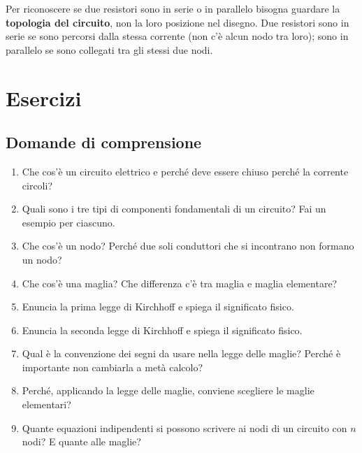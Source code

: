 \begin{attenzione}
Per riconoscere se due resistori sono in serie o in parallelo bisogna guardare la \textbf{topologia del circuito}, non la loro posizione nel disegno. Due resistori sono in serie se sono percorsi dalla stessa corrente (non c'è alcun nodo tra loro); sono in parallelo se sono collegati tra gli stessi due nodi.
\end{attenzione}


























\section{Esercizi}

\subsection{Domande di comprensione}

\begin{enumerate}[leftmargin=1cm]
  \item Che cos'è un circuito elettrico e perché deve essere chiuso perché la corrente circoli?
  \item Quali sono i tre tipi di componenti fondamentali di un circuito? Fai un esempio per ciascuno.
  \item Che cos'è un nodo? Perché due soli conduttori che si incontrano non formano un nodo?
  \item Che cos'è una maglia? Che differenza c'è tra maglia e maglia elementare?
  \item Enuncia la prima legge di Kirchhoff e spiega il significato fisico.
  \item Enuncia la seconda legge di Kirchhoff e spiega il significato fisico.
  \item Qual è la convenzione dei segni da usare nella legge delle maglie? Perché è importante non cambiarla a metà calcolo?
  \item Perché, applicando la legge delle maglie, conviene scegliere le maglie elementari?
  \item Quante equazioni indipendenti si possono scrivere ai nodi di un circuito con \(n\) nodi? E quante alle maglie?
\end{enumerate}

